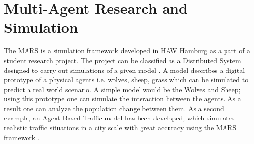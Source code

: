 
\section{Multi-Agent Research and Simulation}
        \label{section:MARS}
        The MARS is a simulation framework developed 
        in HAW Hamburg as a part of a student research project. The project can be classified as a
        Distributed System \cite{DistributedSystems} designed to carry out simulations of a given model 
        \cite{HAWHamburgMARS}. 
        A model describes a digital prototype of a physical agents i.e. wolves, sheep, grass 
        which can be simulated to predict a real world scenario. A simple model would
        be the Wolves and Sheep; using this prototype one can simulate the interaction between the agents. 
        As a result one can analyze the population change between them. As a second example, an Agent-Based Traffic
        model has been developed, which simulates realistic traffic situations in a city scale with great accuracy 
        using the MARS framework \cite{TrafficModel}.

        \par

